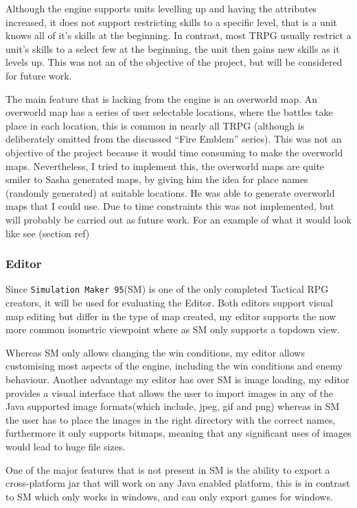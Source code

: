 Although the engine supports units levelling up and having the attributes increased, it does not support restricting  skills to a specific level, that is a unit knows all of it's skills at the beginning. In contrast, most TRPG usually restrict a unit's skills to a select few at the beginning, the unit then gains new skills as it levels up. This was not an of the objective of the project, but will be considered for future work.

The main feature that is lacking from the engine is an overworld map. An overworld map has a series of user selectable locations, where the battles take place in each location, this is common in nearly all TRPG (although is deliberately omitted from the discussed ``Fire Emblem'' series). This was not an objective of the project because it would time consuming to make the overworld maps. Nevertheless, I tried to implement this, the overworld maps are quite smiler to  Sasha generated maps, by giving him the idea for place names (randomly generated) at suitable locations.  He was able to generate overworld maps that I could use. Due to time constraints this was not implemented, but will probably be carried out as future work. For an example of what it would look like see (section ref)

\subsubsection{Editor}
\label{ssub:editor}
Since \texttt{Simulation Maker 95}(SM) is one of the only completed Tactical RPG creators, it will be used for evaluating the Editor.  Both editors support visual map editing but differ in the type of map created,  my editor supports the now more common isometric viewpoint where as SM only supports a topdown view. 

Whereas SM only allows changing the win conditions, my editor allows customising most aspects of the engine, including the win conditions and enemy behaviour.  Another advantage my editor has over SM is image loading, my editor provides a visual interface that allows the user to import images in any of the Java supported image formats(which include, jpeg, gif and png) whereas in SM the user has to place the images in the right directory with the correct names, furthermore it only supports bitmaps, meaning that any significant uses of images would lead to huge file sizes.  

One of the major features that is not present in SM is the ability to export a cross-platform jar that will work on any Java enabled platform, this is in contrast to SM which only works in windows, and can only export games for windows.


